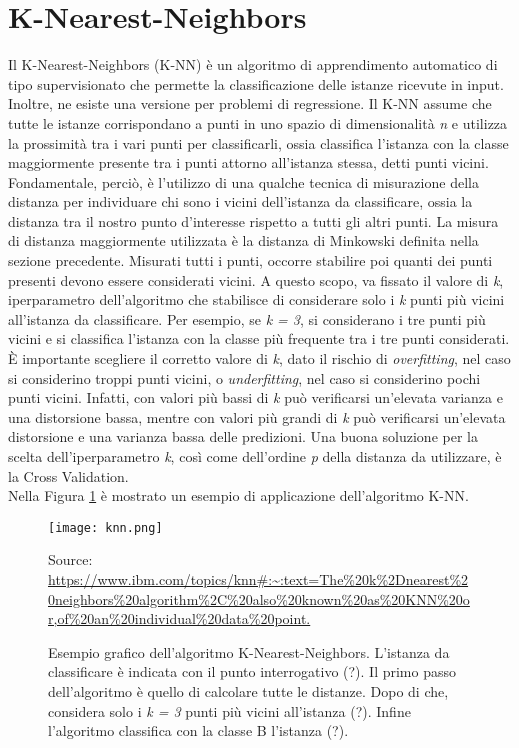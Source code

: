 \section{K-Nearest-Neighbors}
Il K-Nearest-Neighbors (K-NN) \autocite{dasarathy1991nearest} è un algoritmo di apprendimento automatico di tipo supervisionato che permette la classificazione delle istanze ricevute in input. Inoltre, ne esiste una versione per problemi di regressione. Il K-NN assume che tutte le istanze corrispondano a punti in uno spazio di dimensionalità \emph{n} e utilizza la prossimità tra i vari punti per classificarli, ossia classifica l'istanza con la classe maggiormente presente tra i punti attorno all'istanza stessa, detti punti vicini. Fondamentale, perciò, è l'utilizzo di una qualche tecnica di misurazione della distanza per individuare chi sono i vicini dell'istanza da classificare, ossia la distanza tra il nostro punto d'interesse rispetto a tutti gli altri punti. La misura di distanza maggiormente utilizzata è la distanza di Minkowski definita nella sezione precedente. Misurati tutti i punti, occorre stabilire poi quanti dei punti presenti devono essere considerati vicini. A questo scopo, va fissato il valore di \emph{k}, iperparametro dell'algoritmo che stabilisce di considerare solo i \emph{k} punti più vicini all'istanza da classificare. Per esempio, se \emph{k = 3}, si considerano i tre punti più vicini e si classifica l'istanza con la classe più frequente tra i tre punti considerati. È importante scegliere il corretto valore di \emph{k}, dato il rischio di \emph{overfitting}, nel caso si considerino troppi punti vicini, o \emph{underfitting}, nel caso si considerino pochi punti vicini. Infatti, con valori più bassi di \emph{k} può verificarsi un'elevata varianza e una distorsione bassa, mentre con valori più grandi di \emph{k} può verificarsi un'elevata distorsione e una varianza bassa delle predizioni. Una buona soluzione per la scelta dell'iperparametro \emph{k}, così come dell'ordine \emph{p} della distanza da utilizzare, è la Cross Validation.\\
Nella Figura \ref{fig:knn} è mostrato un esempio di applicazione dell'algoritmo K-NN.\\
\begin{figure}[h]
	\begin{center}
		\texttt{[image: knn.png]}
		\caption{Esempio grafico dell'algoritmo K-Nearest-Neighbors.
			L'istanza da classificare è indicata con il punto interrogativo (?).
			Il primo passo dell'algoritmo è quello di calcolare tutte le distanze. Dopo di che, considera solo i \emph{k = 3} punti più vicini all'istanza (?). Infine l'algoritmo classifica con la classe B l'istanza (?).
		} 
		Source: \url{https://www.ibm.com/topics/knn#:~:text=The%20k%2Dnearest%20neighbors%20algorithm%2C%20also%20known%20as%20KNN%20or,of%20an%20individual%20data%20point.}\label{fig:knn}
	\end{center}
\end{figure}

